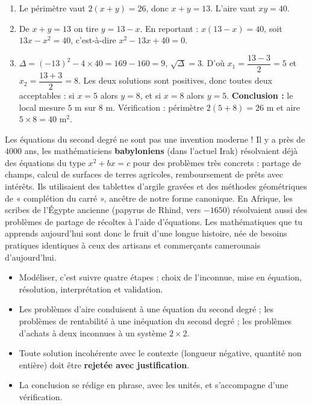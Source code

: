 \documentclass[11pt]{article}
\newcommand{\cle}[1]{{\popxbold\color{popdark}#1}}
\begin{document}
\begin{corrige}
\begin{enumerate}
\item Le périmètre vaut $2(x+y) = 26$, donc $x + y = 13$. L'aire vaut $xy = 40$.
\item De $x + y = 13$ on tire $y = 13 - x$. En reportant : $x(13 - x) = 40$, soit $13x - x^2 = 40$, c'est-à-dire $x^2 - 13x + 40 = 0$.
\item $\Delta = (-13)^2 - 4 \times 40 = 169 - 160 = 9$, $\sqrt{\Delta} = 3$. D'où $x_1 = \dfrac{13 - 3}{2} = 5$ et $x_2 = \dfrac{13 + 3}{2} = 8$. Les deux solutions sont positives, donc toutes deux acceptables : si $x = 5$ alors $y = 8$, et si $x = 8$ alors $y = 5$. \textbf{Conclusion :} le local mesure $5$ m sur $8$ m. Vérification : périmètre $2(5+8) = 26$ m et aire $5 \times 8 = 40$ m$^2$.
\end{enumerate}
\end{corrige}

\begin{savaistu}
Les équations du second degré ne sont pas une invention moderne ! Il y a près de $\num{4000}$ ans, les mathématiciens \textbf{babyloniens} (dans l'actuel Irak) résolvaient déjà des équations du type $x^2 + bx = c$ pour des problèmes très concrets : partage de champs, calcul de surfaces de terres agricoles, remboursement de prêts avec intérêts. Ils utilisaient des tablettes d'argile gravées et des méthodes géométriques de « complétion du carré », ancêtre de notre forme canonique. En Afrique, les scribes de l'Égypte ancienne (papyrus de Rhind, vers $-\num{1650}$) résolvaient aussi des problèmes de partage de récoltes à l'aide d'équations. Les mathématiques que tu apprends aujourd'hui sont donc le fruit d'une longue histoire, née de besoins pratiques identiques à ceux des artisans et commerçants camerounais d'aujourd'hui.
\end{savaistu}

\begin{aretenir}
\begin{itemize}
\item Modéliser, c'est suivre quatre étapes : \cle{choix de l'inconnue}, \cle{mise en équation}, \cle{résolution}, \cle{interprétation et validation}.
\item Les problèmes d'aire conduisent à une équation du second degré ; les problèmes de rentabilité à une inéquation du second degré ; les problèmes d'achats à deux inconnues à un système $2\times 2$.
\item Toute solution incohérente avec le contexte (longueur négative, quantité non entière) doit être \textbf{rejetée avec justification}.
\item La conclusion se rédige en phrase, avec les unités, et s'accompagne d'une vérification.
\end{itemize}
\end{aretenir}
\end{document}
